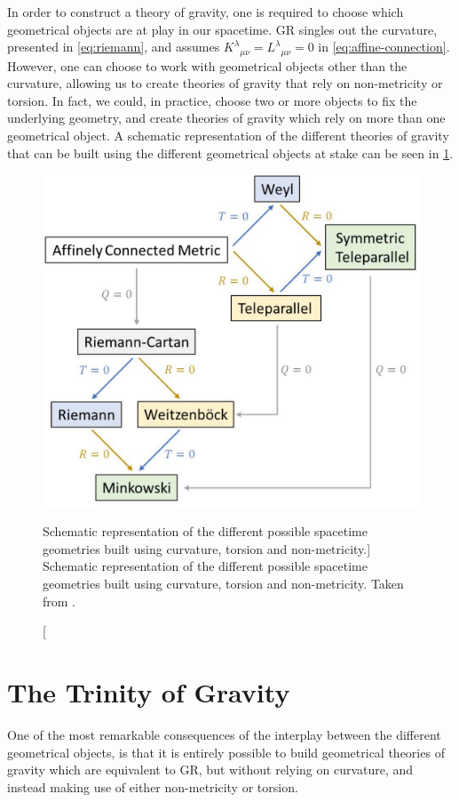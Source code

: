 In order to construct a theory of gravity, one is required to choose which geometrical objects are at play in our spacetime. \Gls{GR} singles out the curvature, presented in \cref{eq:riemann}, and assumes $K^\lambda{}_{\mu \nu} = L^\lambda{}_{\mu \nu} = 0$ in \cref{eq:affine-connection}. However, one can choose to work with geometrical objects other than the curvature, allowing us to create theories of gravity that rely on non-metricity or torsion. In fact, we could, in practice, choose two or more objects to fix the underlying geometry, and create theories of gravity which rely on more than one geometrical object. A schematic representation of the different theories of gravity that can be built using the different geometrical objects at stake can be seen in \cref{fig:geometries}.

\begin{figure}[h!]
    \centering
    \includegraphics[width=0.6\columnwidth]{figures/geometries.pdf}
    \caption
    [Schematic representation of the different possible spacetime geometries built using curvature, torsion and non-metricity.]
    {Schematic representation of the different possible spacetime geometries built using curvature, torsion and non-metricity. Taken from \cite{Conroy2017}.}
    \label{fig:geometries}
\end{figure}


\section{The Trinity of Gravity}

One of the most remarkable consequences of the interplay between the different geometrical objects, is that it is entirely possible to build geometrical theories of gravity which are equivalent to \gls{GR}, but without relying on curvature, and instead making use of either non-metricity or torsion.

